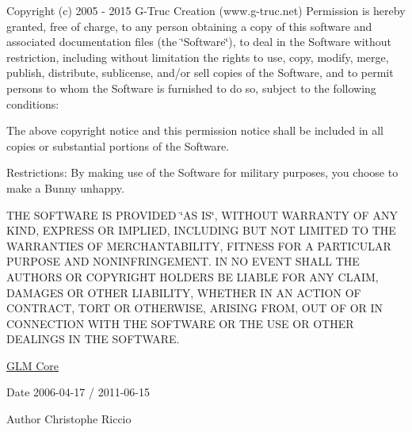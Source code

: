 Copyright (c) 2005 -\/ 2015 G-\/\-Truc Creation (www.\-g-\/truc.\-net) Permission is hereby granted, free of charge, to any person obtaining a copy of this software and associated documentation files (the \char`\"{}\-Software\char`\"{}), to deal in the Software without restriction, including without limitation the rights to use, copy, modify, merge, publish, distribute, sublicense, and/or sell copies of the Software, and to permit persons to whom the Software is furnished to do so, subject to the following conditions\-:

The above copyright notice and this permission notice shall be included in all copies or substantial portions of the Software.

Restrictions\-: By making use of the Software for military purposes, you choose to make a Bunny unhappy.

T\-H\-E S\-O\-F\-T\-W\-A\-R\-E I\-S P\-R\-O\-V\-I\-D\-E\-D \char`\"{}\-A\-S I\-S\char`\"{}, W\-I\-T\-H\-O\-U\-T W\-A\-R\-R\-A\-N\-T\-Y O\-F A\-N\-Y K\-I\-N\-D, E\-X\-P\-R\-E\-S\-S O\-R I\-M\-P\-L\-I\-E\-D, I\-N\-C\-L\-U\-D\-I\-N\-G B\-U\-T N\-O\-T L\-I\-M\-I\-T\-E\-D T\-O T\-H\-E W\-A\-R\-R\-A\-N\-T\-I\-E\-S O\-F M\-E\-R\-C\-H\-A\-N\-T\-A\-B\-I\-L\-I\-T\-Y, F\-I\-T\-N\-E\-S\-S F\-O\-R A P\-A\-R\-T\-I\-C\-U\-L\-A\-R P\-U\-R\-P\-O\-S\-E A\-N\-D N\-O\-N\-I\-N\-F\-R\-I\-N\-G\-E\-M\-E\-N\-T. I\-N N\-O E\-V\-E\-N\-T S\-H\-A\-L\-L T\-H\-E A\-U\-T\-H\-O\-R\-S O\-R C\-O\-P\-Y\-R\-I\-G\-H\-T H\-O\-L\-D\-E\-R\-S B\-E L\-I\-A\-B\-L\-E F\-O\-R A\-N\-Y C\-L\-A\-I\-M, D\-A\-M\-A\-G\-E\-S O\-R O\-T\-H\-E\-R L\-I\-A\-B\-I\-L\-I\-T\-Y, W\-H\-E\-T\-H\-E\-R I\-N A\-N A\-C\-T\-I\-O\-N O\-F C\-O\-N\-T\-R\-A\-C\-T, T\-O\-R\-T O\-R O\-T\-H\-E\-R\-W\-I\-S\-E, A\-R\-I\-S\-I\-N\-G F\-R\-O\-M, O\-U\-T O\-F O\-R I\-N C\-O\-N\-N\-E\-C\-T\-I\-O\-N W\-I\-T\-H T\-H\-E S\-O\-F\-T\-W\-A\-R\-E O\-R T\-H\-E U\-S\-E O\-R O\-T\-H\-E\-R D\-E\-A\-L\-I\-N\-G\-S I\-N T\-H\-E S\-O\-F\-T\-W\-A\-R\-E.

\hyperlink{group__core}{G\-L\-M Core}

\begin{DoxyDate}{Date}
2006-\/04-\/17 / 2011-\/06-\/15 
\end{DoxyDate}
\begin{DoxyAuthor}{Author}
Christophe Riccio 
\end{DoxyAuthor}
